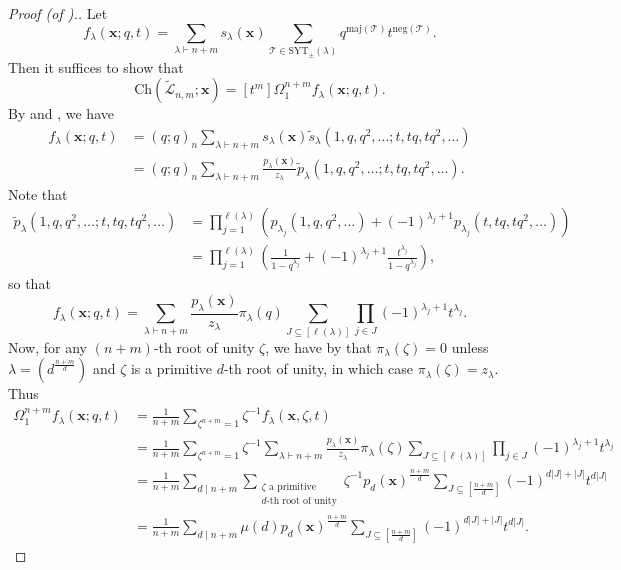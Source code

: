 \documentclass[11pt]{article}
\theoremstyle{definition}
\numberwithin{equation}{section}
\newcommand\ch{\Ch}
\newcommand\maj{\mathrm{maj}}
\newcommand\negg{\mathrm{neg}}
\newcommand\SYT{\mathrm{SYT}}
\newcommand\xb{\mathbf{x}}
\newcommand\Ltil{\widetilde{\mathcal{L}}}
\newcommand\ptil{\tilde{p}}
\newcommand\stil{\tilde{s}}
\newcommand\Ch{\mathrm{Ch}}
\begin{document}
\begin{proof}[Proof (of ).]
    Let 
    \[
    f_\lambda(\xb;q,t) = \sum_{\lambda \vdash n+m} s_\lambda(\xb) \sum_{\mathcal{T} \in \SYT_\pm(\lambda)} q^{\maj(\mathcal{T})}t^{\negg(\mathcal{T})}.
    \]
    Then it suffices to show that
    \[
    \ch(\Ltil_{n,m};\xb) = [t^m]\Omega_1^{n+m}f_\lambda(\xb;q,t).
    \]
    By  and , we have
    \begin{align*}
    f_\lambda(\xb;q,t) &= (q;q)_n \sum_{\lambda \vdash n+m} s_\lambda(\xb) \stil_\lambda(1,q,q^2,\ldots;t,tq,tq^2,\ldots) \\
    &= (q;q)_n \sum_{\lambda \vdash n+m} \frac{p_\lambda(\xb)}{z_\lambda} \ptil_\lambda(1,q,q^2,\ldots;t,tq,tq^2,\ldots).
    \end{align*}
    Note that
    \begin{align*}
    \ptil_\lambda(1,q,q^2,\ldots;t,tq,tq^2,\ldots) &= \prod_{j=1}^{\ell(\lambda)} (p_{\lambda_j}(1,q,q^2,\ldots) + (-1)^{\lambda_j+1}p_{\lambda_j}(t,tq,tq^2,\ldots)) \\
    &= \prod_{j=1}^{\ell(\lambda)} \left( \frac{1}{1-q^{\lambda_j}} + (-1)^{\lambda_j+1}\frac{t^{\lambda_j}}{1-q^{\lambda_j}} \right),
    \end{align*}
    so that
    \[
    f_\lambda(\xb;q,t) = \sum_{\lambda \vdash n+m} \frac{p_\lambda(\xb)}{z_\lambda} \pi_\lambda(q) \sum_{J \subseteq [\ell(\lambda)]} \prod_{j \in J} (-1)^{\lambda_j+1}t^{\lambda_j}.
    \]
    Now, for any $(n+m)$-th root of unity $\zeta$, we have by  that $\pi_\lambda(\zeta) = 0$ unless $\lambda = (d^\frac{n+m}{d})$ and $\zeta$ is a primitive $d$-th root of unity, in which case $\pi_\lambda(\zeta) = z_\lambda$. Thus
    \begin{align*}
    \Omega_1^{n+m}f_\lambda(\xb;q,t) &= \frac{1}{n+m} \sum_{\zeta^{n+m} = 1} \zeta^{-1} f_\lambda(\xb,\zeta,t) \\
    &= \frac{1}{n+m} \sum_{\zeta^{n+m} = 1} \zeta^{-1} \sum_{\lambda \vdash n+m} \frac{p_\lambda(\xb)}{z_\lambda} \pi_\lambda(\zeta) \sum_{J \subseteq [\ell(\lambda)]} \prod_{j \in J} (-1)^{\lambda_j+1}t^{\lambda_j} \\
    &= \frac{1}{n+m} \sum_{d \mid n+m} \sum_{\substack{\zeta \text{ a primitive} \\ \text{$d$-th root of unity}}} \zeta^{-1} p_d(\xb)^\frac{n+m}{d} \sum_{J \subseteq [\frac{n+m}{d}]} (-1)^{d|J| + |J|}t^{d|J|} \\
    &= \frac{1}{n+m} \sum_{d \mid n+m} \mu(d) p_d(\xb)^\frac{n+m}{d} \sum_{J \subseteq [\frac{n+m}{d}]} (-1)^{d|J| + |J|}t^{d|J|}.

\end{align*}
\end{proof}
\end{document}

